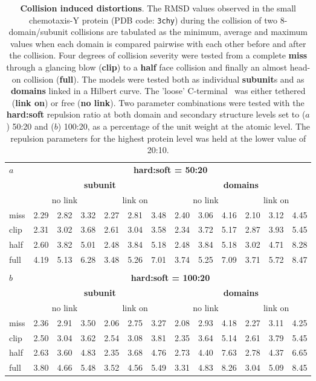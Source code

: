 \begin{table}
\centering
\begin{tabular}{l|rrr|rrr||rrr|rrr|}
$a$  & \multicolumn{12}{c}{\bf hard:soft = 50:20} \\
     & \multicolumn{6}{|c||}{\bf subunit} & \multicolumn{6}{c|}{\bf domains} \\
     & \multicolumn{3}{|c|}{no link} & \multicolumn{3}{c||}{link on}  & \multicolumn{3}{c|}{no link} & \multicolumn{3}{c|}{link on}\\
\hline
miss & 2.29 & 2.82 & 3.32 &   2.27 & 2.81 & 3.48 &      2.40 & 3.06 & 4.16 &   2.10 & 3.12 & 4.45 \\
clip & 2.31 & 3.02 & 3.68 &   2.61 & 3.04 & 3.58 &      2.34 & 3.72 & 5.17 &   2.87 & 3.93 & 5.45 \\
half & 2.60 & 3.82 & 5.01 &   2.48 & 3.84 & 5.18 &      2.48 & 3.84 & 5.18 &   3.02 & 4.71 & 8.28 \\
full & 4.19 & 5.13 & 6.28 &   3.48 & 5.26 & 7.01 &      3.74 & 5.25 & 7.09 &   3.71 & 5.72 & 8.47 \\
\hline \hline
       \multicolumn{13}{c}{} \\
$b$  & \multicolumn{12}{c}{\bf hard:soft = 100:20} \\
     & \multicolumn{6}{|c||}{\bf subunit} & \multicolumn{6}{c|}{\bf domains} \\
     & \multicolumn{3}{|c|}{no link} & \multicolumn{3}{c||}{link on}  & \multicolumn{3}{c|}{no link} & \multicolumn{3}{c|}{link on}\\
\hline
miss & 2.36 & 2.91 & 3.50 &   2.06 & 2.75 & 3.27 &      2.08 & 2.93 & 4.18 &   2.27 & 3.11 & 4.25 \\
clip & 2.50 & 3.04 & 3.62 &   2.54 & 3.08 & 3.81 &      2.35 & 3.64 & 5.14 &   2.61 & 3.79 & 5.45 \\
half & 2.63 & 3.60 & 4.83 &   2.35 & 3.68 & 4.76 &      2.73 & 4.40 & 7.63 &   2.78 & 4.37 & 6.65 \\
full & 3.80 & 4.66 & 5.48 &   3.52 & 4.56 & 5.49 &      3.31 & 4.83 & 8.26 &   3.04 & 5.09 & 8.45 \\
\hline \hline
\end{tabular}
\caption{
\label{Tab:bumps}
{\bf Collision induced distortions}.
The RMSD values observed in the small chemotaxis-Y protein (PDB code: {\tt 3chy}) during the collision
of two 8-domain/subunit collisions are tabulated as the minimum, average and maximum values when each
domain is compared pairwise with each other before and after the collision.   Four degrees of collision
severity were tested from a complete {\bf miss} through a glancing blow ({\bf clip}) to a {\bf half} face
collision and finally an almost head-on collision ({\bf full}).    The models were tested both as individual
{\bf subunit}s and as {\bf domains} linked in a Hilbert curve.   The 'loose' C-terminal \AH\ was either
tethered ({\bf link on}) or free ({\bf no link}).    Two parameter combinations were tested with the
{\bf hard:soft} repulsion ratio at both domain and secondary structure levels set to ($a$) 50:20 and ($b$) 
100:20, as a percentage of the unit weight at the atomic level.  The repulsion parameters for the 
highest protein level was held at the lower value of 20:10.
}
\end{table}


